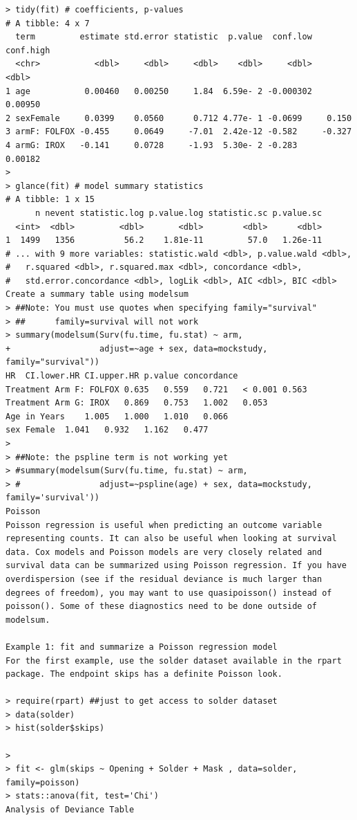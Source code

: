 \documentclass[
]{book}
\begin{document}
\begin{verbatim}
> tidy(fit) # coefficients, p-values
# A tibble: 4 x 7
  term         estimate std.error statistic  p.value  conf.low conf.high
  <chr>           <dbl>     <dbl>     <dbl>    <dbl>     <dbl>     <dbl>
1 age           0.00460   0.00250     1.84  6.59e- 2 -0.000302   0.00950
2 sexFemale     0.0399    0.0560      0.712 4.77e- 1 -0.0699     0.150  
3 armF: FOLFOX -0.455     0.0649     -7.01  2.42e-12 -0.582     -0.327  
4 armG: IROX   -0.141     0.0728     -1.93  5.30e- 2 -0.283      0.00182
> 
> glance(fit) # model summary statistics
# A tibble: 1 x 15
      n nevent statistic.log p.value.log statistic.sc p.value.sc
  <int>  <dbl>         <dbl>       <dbl>        <dbl>      <dbl>
1  1499   1356          56.2    1.81e-11         57.0   1.26e-11
# ... with 9 more variables: statistic.wald <dbl>, p.value.wald <dbl>,
#   r.squared <dbl>, r.squared.max <dbl>, concordance <dbl>,
#   std.error.concordance <dbl>, logLik <dbl>, AIC <dbl>, BIC <dbl>
Create a summary table using modelsum
> ##Note: You must use quotes when specifying family="survival" 
> ##      family=survival will not work
> summary(modelsum(Surv(fu.time, fu.stat) ~ arm, 
+                  adjust=~age + sex, data=mockstudy, family="survival"))
HR  CI.lower.HR CI.upper.HR p.value concordance
Treatment Arm F: FOLFOX 0.635   0.559   0.721   < 0.001 0.563
Treatment Arm G: IROX   0.869   0.753   1.002   0.053   
Age in Years    1.005   1.000   1.010   0.066   
sex Female  1.041   0.932   1.162   0.477   
> 
> ##Note: the pspline term is not working yet
> #summary(modelsum(Surv(fu.time, fu.stat) ~ arm, 
> #                adjust=~pspline(age) + sex, data=mockstudy, family='survival'))
Poisson
Poisson regression is useful when predicting an outcome variable representing counts. It can also be useful when looking at survival data. Cox models and Poisson models are very closely related and survival data can be summarized using Poisson regression. If you have overdispersion (see if the residual deviance is much larger than degrees of freedom), you may want to use quasipoisson() instead of poisson(). Some of these diagnostics need to be done outside of modelsum.

Example 1: fit and summarize a Poisson regression model
For the first example, use the solder dataset available in the rpart package. The endpoint skips has a definite Poisson look.

> require(rpart) ##just to get access to solder dataset
> data(solder)
> hist(solder$skips)

> 
> fit <- glm(skips ~ Opening + Solder + Mask , data=solder, family=poisson)
> stats::anova(fit, test='Chi')
Analysis of Deviance Table


\end{verbatim}
\end{document}
